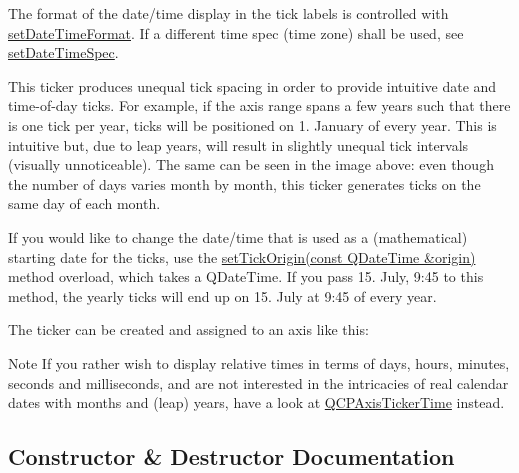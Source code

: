 The format of the date/time display in the tick labels is controlled with \hyperlink{classQCPAxisTickerDateTime_ad52660a82f688395468674d555f6a86b}{set\+Date\+Time\+Format}. If a different time spec (time zone) shall be used, see \hyperlink{classQCPAxisTickerDateTime_afbd987c7197e42ab61e67fb1c38abebc}{set\+Date\+Time\+Spec}.

This ticker produces unequal tick spacing in order to provide intuitive date and time-\/of-\/day ticks. For example, if the axis range spans a few years such that there is one tick per year, ticks will be positioned on 1. January of every year. This is intuitive but, due to leap years, will result in slightly unequal tick intervals (visually unnoticeable). The same can be seen in the image above\+: even though the number of days varies month by month, this ticker generates ticks on the same day of each month.

If you would like to change the date/time that is used as a (mathematical) starting date for the ticks, use the \hyperlink{classQCPAxisTickerDateTime_a2ea905872b8171847a49a5e093fb0c48}{set\+Tick\+Origin(const Q\+Date\+Time \&origin)} method overload, which takes a Q\+Date\+Time. If you pass 15. July, 9\+:45 to this method, the yearly ticks will end up on 15. July at 9\+:45 of every year.

The ticker can be created and assigned to an axis like this\+: 
\begin{DoxyCodeInclude}
\end{DoxyCodeInclude}
 \begin{DoxyNote}{Note}
If you rather wish to display relative times in terms of days, hours, minutes, seconds and milliseconds, and are not interested in the intricacies of real calendar dates with months and (leap) years, have a look at \hyperlink{classQCPAxisTickerTime}{Q\+C\+P\+Axis\+Ticker\+Time} instead. 
\end{DoxyNote}


\subsection{Constructor \& Destructor Documentation}
